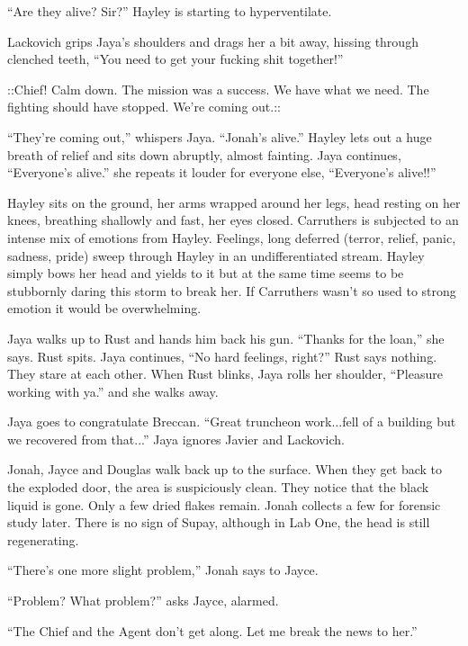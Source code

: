``Are they alive?  Sir?''  Hayley is starting to hyperventilate.

Lackovich grips Jaya's shoulders and drags her a bit away, hissing through clenched teeth, ``You need to get your fucking shit together!''

 {\color[RGB]{74,134,232}::Chief!  Calm down.  The mission was a success.  We have what we need.  The fighting should have stopped.  We're coming out.::} 

``They're coming out,'' whispers Jaya.  ``Jonah's alive.''  Hayley lets out a huge breath of relief and sits down abruptly, almost fainting.  Jaya continues, ``Everyone's alive.''  she repeats it louder for everyone else, ``Everyone's alive!!''



Hayley sits on the ground, her arms wrapped around her legs, head resting on her knees, breathing shallowly and fast, her eyes closed.  Carruthers is subjected to an intense mix of emotions from Hayley.  Feelings, long deferred (terror, relief, panic, sadness, pride) sweep through Hayley in an undifferentiated stream.  Hayley simply bows her head and yields to it but at the same time seems to be stubbornly daring this storm to break her.  If Carruthers wasn't so used to strong emotion it would be overwhelming. 



Jaya walks up to Rust and hands him back his gun.  ``Thanks for the loan,'' she says.  Rust spits.  Jaya continues, ``No hard feelings, right?'' Rust says nothing.  They stare at each other.  When Rust blinks, Jaya rolls her shoulder, ``Pleasure working with ya.'' and she walks away.



Jaya goes to congratulate Breccan.  ``Great truncheon work...fell of a building but we recovered from that...''  Jaya ignores Javier and Lackovich.



Jonah, Jayce and Douglas walk back up to the surface. When they get back to the exploded door, the area is suspiciously clean.  They notice that the black liquid is gone.  Only a few dried flakes remain.  Jonah collects a few for forensic study later.  There is no sign of Supay, although in Lab One, the head is still regenerating.

``There's one more slight problem,'' Jonah says to Jayce.

``Problem?  What problem?'' asks Jayce, alarmed.

``The Chief and the Agent don't get along.  Let me break the news to her.''


